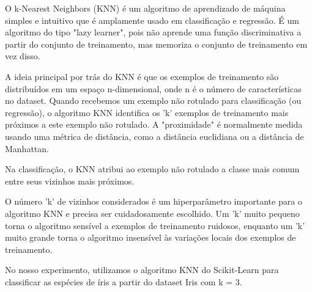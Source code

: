 \begin{multicols}{2}
O k-Nearest Neighbors (KNN) é um algoritmo de aprendizado de máquina simples e intuitivo que é amplamente usado em classificação e regressão. É um algoritmo do tipo "lazy learner", pois não aprende uma função discriminativa a partir do conjunto de treinamento, mas memoriza o conjunto de treinamento em vez disso.

A ideia principal por trás do KNN é que os exemplos de treinamento são distribuídos em um espaço n-dimensional, onde n é o número de características no dataset. Quando recebemos um exemplo não rotulado para classificação (ou regressão), o algoritmo KNN identifica os 'k' exemplos de treinamento mais próximos a este exemplo não rotulado. A "proximidade" é normalmente medida usando uma métrica de distância, como a distância euclidiana ou a distância de Manhattan.

Na classificação, o KNN atribui ao exemplo não rotulado a classe mais comum entre seus vizinhos mais próximos.

O número 'k' de vizinhos considerados é um hiperparâmetro importante para o algoritmo KNN e precisa ser cuidadosamente escolhido. Um 'k' muito pequeno torna o algoritmo sensível a exemplos de treinamento ruidosos, enquanto um 'k' muito grande torna o algoritmo insensível às variações locais dos exemplos de treinamento.

No nosso experimento, utilizamos o algoritmo KNN do Scikit-Learn para classificar as espécies de íris a partir do dataset Iris com k = 3.
\end{multicols}


